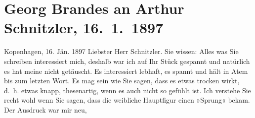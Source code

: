 

         
         \renewcommand{\erwaehntePersonen}{Personen: Richard Beer-Hofmann, Astrid Brandes, Paul Goldmann, Henrik Ibsen, Edith Philipp, William Shakespeare}
         \renewcommand{\erwaehnteOrte}{Orte: Havnegade, Kopenhagen, Wien}
         \renewcommand{\erwaehnteWerke}{Werke: Anatol, Freiwild. Schauspiel in 3 Akten, William Shakespeare}
               \section[Georg Brandes an Arthur Schnitzler, 16. 1. 1897]{ Georg Brandes an Arthur Schnitzler, 16. 1. 1897}\nopagebreak{}\rehead{ }\begin{ledgroupsized}[t]{13cm}\normalsize\beginnumbering \toendnotes[C]{\smallbreak\pagebreak[2]} 
\toendnotes[C]{\smallbreak}\pstart
           \raggedleft{}{\pb}Kopenhagen, 16.{ }Jän.{ }1897\pend
           \pstart\center{}Liebster Herr Schnitzler.\pend\pstart
           Sie wissen: Alles was Sie schreiben interessiert mich, deshalb war ich auf Ihr Stück gespannt und natürlich es
               hat meine \label{T_L00639_1v}\label{T_L00639_1h} nicht getäuscht. Es interessiert lebhaft, es
               spannt und hält in Atem bis zum letzten Wort.\pend
           \pstart
           Es mag sein wie Sie sagen, dass es etwas trocken wirkt, d. h. etwas knapp,
               thesenartig, wenn es auch nicht so gefühlt ist. Ich verstehe Sie recht wohl wenn Sie
               sagen, dass die weibliche Hauptfigur einen »Sprung« bekam. Der Ausdruck war mir neu,

\end{ledgroupsized}
